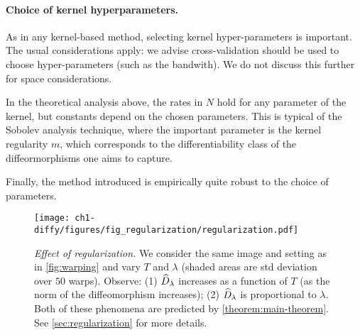 \paragraph{Choice of kernel hyperparameters.}
As in any kernel-based method, selecting kernel hyper-parameters is important. The usual considerations apply: we advise cross-validation should be used to choose hyper-parameters (such as the bandwith). We do not discuss this further for space considerations.

In the theoretical analysis above, the rates in $N$ hold for any parameter of the kernel, but constants depend on the chosen parameters. This is typical of the Sobolev analysis technique, where the important parameter is the kernel regularity $m$, which corresponds to the differentiability class of the diffeormorphisms one aims to capture.

Finally, the method introduced is empirically quite robust to the choice of parameters.





\begin{figure}[t]
    \centering
    \texttt{[image: ch1-diffy/figures/fig\_regularization/regularization.pdf]}
    \caption[Effect of regularization on Diffy.]{\emph{Effect of regularization.} We consider the same image and setting as in \cref{fig:warping} and vary $T$ and $\lambda$ (shaded areas are std deviation over $50$ warps). Observe: (1) $\widehat D_\lambda$ increases as a function of $T$ (as the norm of the diffeomorphism increases); (2) $\widehat D_\lambda$ is  proportional to $\lambda$. Both of these phenomena are predicted by \cref{theorem:main-theorem}. See \cref{sec:regularization} for more details.}
    \label{fig:regularization}
\end{figure}


